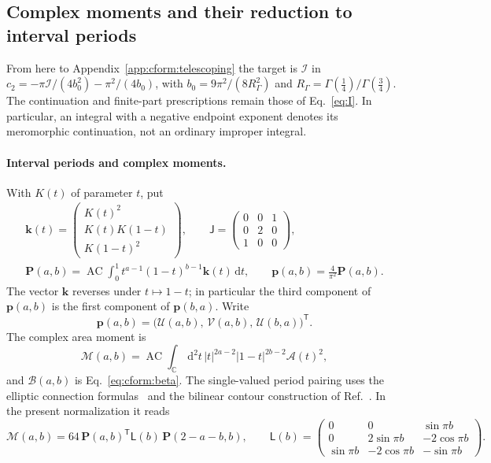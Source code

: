 \documentclass[11pt,a4paper]{article}
\numberwithin{equation}{section}
\newcommand{\dd}{\,\mathrm d}
\newcommand{\AC}{\operatorname{AC}}
\newcommand{\cI}{\mathcal I}
\begin{document}
\subsection{Complex moments and their reduction to interval periods}\label{app:cform:moments}
From here to Appendix~\ref{app:cform:telescoping} the target is $\cI$ in
$c_2=-\pi\cI/(4b_0^2)-\pi^2/(4b_0)$, with $b_0=9\pi^2/(8R_\Gamma^2)$ and $R_\Gamma=\Gamma(\frac14)/\Gamma(\frac34)$. The
continuation and finite-part prescriptions remain those of Eq.~\eqref{eq:I}. In particular, an integral with a negative
endpoint exponent denotes its meromorphic continuation, not an ordinary improper integral.

\paragraph{Interval periods and complex moments.} With $K(t)$ of parameter $t$, put
\begin{equation}
\begin{gathered}
 \mathbf k(t)=\begin{pmatrix}K(t)^2\\K(t)K(1-t)\\K(1-t)^2\end{pmatrix},\qquad
 \mathsf J=\begin{pmatrix}0&0&1\\0&2&0\\1&0&0\end{pmatrix},\\
 \mathbf P(a,b)=\AC\!\int_0^1t^{a-1}(1-t)^{b-1}\mathbf k(t)\dd t,\qquad
 \mathbf p(a,b)=\frac4{\pi^2}\mathbf P(a,b).
\end{gathered}
 \label{eq:cform:periods}
\end{equation}
The vector $\mathbf k$ reverses under $t\mapsto1-t$; in particular the third component of $\mathbf p(a,b)$ is the first
component of $\mathbf p(b,a)$. Write
\begin{equation}
 \mathbf p(a,b)=\bigl(\mathcal U(a,b),\,\mathcal V(a,b),\,\mathcal U(b,a)\bigr)^{\mathsf T}.
\end{equation}
The complex area moment is
\begin{equation}
 \mathcal M(a,b)=\AC\!\int_{\mathbb C}\dd^2t\,|t|^{2a-2}|1-t|^{2b-2}\mathcal A(t)^2,
\end{equation}
and $\mathcal B(a,b)$ is Eq.~\eqref{eq:cform:beta}. The single-valued period pairing uses the elliptic connection
formulas~\cite{NIST:DLMF} and the bilinear contour construction of Ref.~\cite{Duhr:2023}. In the present
normalization it reads
\begin{equation}
 \mathcal M(a,b)=64\,\mathbf P(a,b)^{\mathsf T}\mathsf L(b)\,\mathbf P(2-a-b,b),\qquad
 \mathsf L(b)=\begin{pmatrix}0&0&\sin\pi b\\0&2\sin\pi b&-2\cos\pi b\\\sin\pi b&-2\cos\pi b&-\sin\pi b\end{pmatrix}.
 \label{eq:cform:pairing}
\end{equation}
\end{document}
